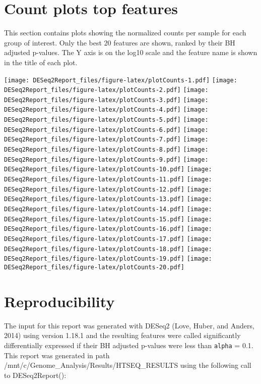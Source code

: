 \documentclass[]{article}
\begin{document}
\section{Count plots top features}\label{count-plots-top-features}

This section contains plots showing the normalized counts per sample for
each group of interest. Only the best 20 features are shown, ranked by
their BH adjusted p-values. The Y axis is on the log10 scale and the
feature name is shown in the title of each plot.

\texttt{[image: DESeq2Report\_files/figure-latex/plotCounts-1.pdf]}
\texttt{[image: DESeq2Report\_files/figure-latex/plotCounts-2.pdf]}
\texttt{[image: DESeq2Report\_files/figure-latex/plotCounts-3.pdf]}
\texttt{[image: DESeq2Report\_files/figure-latex/plotCounts-4.pdf]}
\texttt{[image: DESeq2Report\_files/figure-latex/plotCounts-5.pdf]}
\texttt{[image: DESeq2Report\_files/figure-latex/plotCounts-6.pdf]}
\texttt{[image: DESeq2Report\_files/figure-latex/plotCounts-7.pdf]}
\texttt{[image: DESeq2Report\_files/figure-latex/plotCounts-8.pdf]}
\texttt{[image: DESeq2Report\_files/figure-latex/plotCounts-9.pdf]}
\texttt{[image: DESeq2Report\_files/figure-latex/plotCounts-10.pdf]}
\texttt{[image: DESeq2Report\_files/figure-latex/plotCounts-11.pdf]}
\texttt{[image: DESeq2Report\_files/figure-latex/plotCounts-12.pdf]}
\texttt{[image: DESeq2Report\_files/figure-latex/plotCounts-13.pdf]}
\texttt{[image: DESeq2Report\_files/figure-latex/plotCounts-14.pdf]}
\texttt{[image: DESeq2Report\_files/figure-latex/plotCounts-15.pdf]}
\texttt{[image: DESeq2Report\_files/figure-latex/plotCounts-16.pdf]}
\texttt{[image: DESeq2Report\_files/figure-latex/plotCounts-17.pdf]}
\texttt{[image: DESeq2Report\_files/figure-latex/plotCounts-18.pdf]}
\texttt{[image: DESeq2Report\_files/figure-latex/plotCounts-19.pdf]}
\texttt{[image: DESeq2Report\_files/figure-latex/plotCounts-20.pdf]}

\section{Reproducibility}\label{reproducibility}

The input for this report was generated with DESeq2 (Love, Huber, and
Anders, 2014) using version 1.18.1 and the resulting features were
called significantly differentially expressed if their BH adjusted
p-values were less than \texttt{alpha} = 0.1. This report was generated
in path /mnt/c/Genome\_Analysis/Results/HTSEQ\_RESULTS using the
following call to DESeq2Report():
\end{document}
